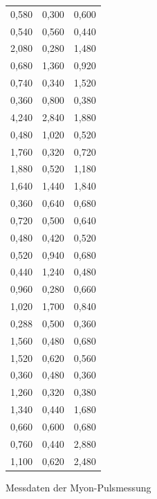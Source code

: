 \begin{figure}[htbp]
\begin{tabular}{c|c|c}
                                0,580 & 0,300 & 0,600\\
                                0,540 & 0,560 & 0,440\\
                                2,080 & 0,280 & 1,480\\
                                0,680 & 1,360 & 0,920\\
                                0,740 & 0,340 & 1,520\\
                                0,360 & 0,800 & 0,380\\
                                4,240 & 2,840 & 1,880\\
                                0,480 & 1,020 & 0,520\\
                                1,760 & 0,320 & 0,720\\
                                1,880 & 0,520 & 1,180\\
                                1,640 & 1,440 & 1,840\\
                                0,360 & 0,640 & 0,680\\
                                0,720 & 0,500 & 0,640\\
                                0,480 & 0,420 & 0,520\\
                                0,520 & 0,940 & 0,680\\
                                0,440 & 1,240 & 0,480\\
                                0,960 & 0,280 & 0,660\\
                                1,020 & 1,700 & 0,840\\
                                0,288 & 0,500 & 0,360\\
                                1,560 & 0,480 & 0,680\\
                                1,520 & 0,620 & 0,560\\
                                0,360 & 0,480 & 0,360\\
                                1,260 & 0,320 & 0,380\\
                                1,340 & 0,440 & 1,680\\
                                0,660 & 0,600 & 0,680\\
                                0,760 & 0,440 & 2,880\\
                                1,100 & 0,620 & 2,480\\
                    \end{tabular}
                \caption{Messdaten der Myon-Pulsmessung}
                \label{pulses} 
            \end{figure}
